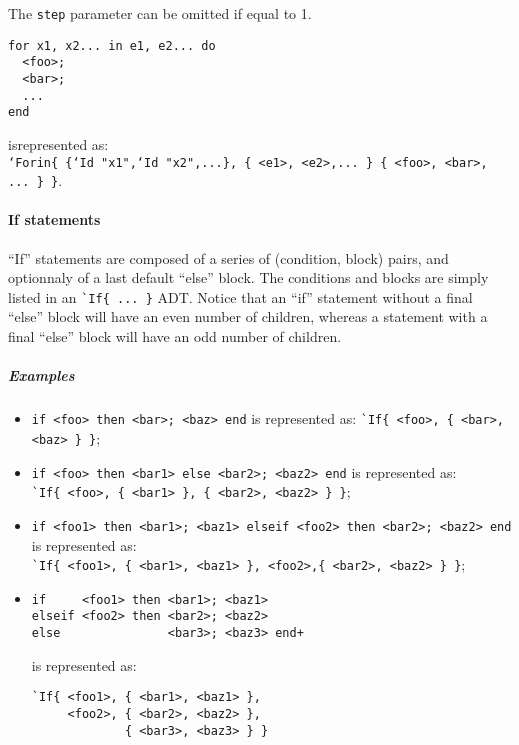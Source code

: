 The \verb|step| parameter can be omitted if equal to 1.

\begin{verbatim}
for x1, x2... in e1, e2... do
  <foo>;
  <bar>;
  ...
end
\end{verbatim}
isrepresented as:\\ 
{\tt `Forin\{ \{`Id "x1",`Id "x2",...\}, \{ <e1>, <e2>,... \} \{
 <foo>, <bar>, ... \} \}}.

\paragraph{If statements}
``If'' statements are composed of a series of (condition, block)
pairs, and optionnaly of a last default ``else'' block. The conditions
and blocks are simply listed in an \verb|`If{ ... }| ADT. Notice that
an ``if'' statement without a final ``else'' block will have an even
number of children, whereas a statement with a final ``else'' block
will have an odd number of children.

\subparagraph{Examples}
\begin{itemize}

\item \verb+if <foo> then <bar>; <baz> end+ is represented as:
  \verb+`If{ <foo>, { <bar>, <baz> } }+;

\item \verb+if <foo> then <bar1> else <bar2>; <baz2> end+
  is represented as: \\
  \verb+`If{ <foo>, { <bar1> }, { <bar2>, <baz2> } }+;

\item
  \verb+if <foo1> then <bar1>; <baz1> elseif <foo2> then <bar2>; <baz2> end+
  \\ is represented as: \\
  \verb+`If{ <foo1>, { <bar1>, <baz1> }, <foo2>,{ <bar2>, <baz2> } }+;

\item
\begin{verbatim}
if     <foo1> then <bar1>; <baz1> 
elseif <foo2> then <bar2>; <baz2> 
else               <bar3>; <baz3> end+ 
\end{verbatim}
is represented as:
\begin{verbatim}
`If{ <foo1>, { <bar1>, <baz1> }, 
     <foo2>, { <bar2>, <baz2> },
             { <bar3>, <baz3> } }
\end{verbatim}

\end{itemize}

